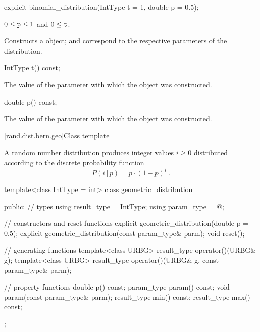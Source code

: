 %
\begin{itemdecl}
explicit binomial_distribution(IntType t = 1, double p = 0.5);
\end{itemdecl}

\begin{itemdescr}
\pnum\requires
 $0 \leq \texttt{p} \leq 1$ and $0 \leq \texttt{t} $.

\pnum\effects Constructs a  object;
  and 
 correspond to the respective parameters of the distribution.
\end{itemdescr}

%
\begin{itemdecl}
IntType t() const;
\end{itemdecl}%
\begin{itemdescr}
\pnum\returns The value of the  parameter
 with which the object was constructed.
\end{itemdescr}

%
\begin{itemdecl}
double p() const;
\end{itemdecl}

\begin{itemdescr}
\pnum\returns The value of the  parameter
 with which the object was constructed.
\end{itemdescr}


[rand.dist.bern.geo]{Class template }
%
%

\pnum
A  random number distribution
produces integer values $i \geq 0$
distributed according to
the discrete probability function
%
%
\[%
 P(i\,|\,p)
      = p \cdot (1-p)^{i}
\; \mbox{.}
\]

%
\begin{codeblock}
template<class IntType = int>
  class geometric_distribution {
  public:
    // types
    using result_type = IntType;
    using param_type  = @\unspec@;

    // constructors and reset functions
    explicit geometric_distribution(double p = 0.5);
    explicit geometric_distribution(const param_type& parm);
    void reset();

    // generating functions
    template<class URBG>
      result_type operator()(URBG& g);
    template<class URBG>
      result_type operator()(URBG& g, const param_type& parm);

    // property functions
    double p() const;
    param_type param() const;
    void param(const param_type& parm);
    result_type min() const;
    result_type max() const;
  };
\end{codeblock}



